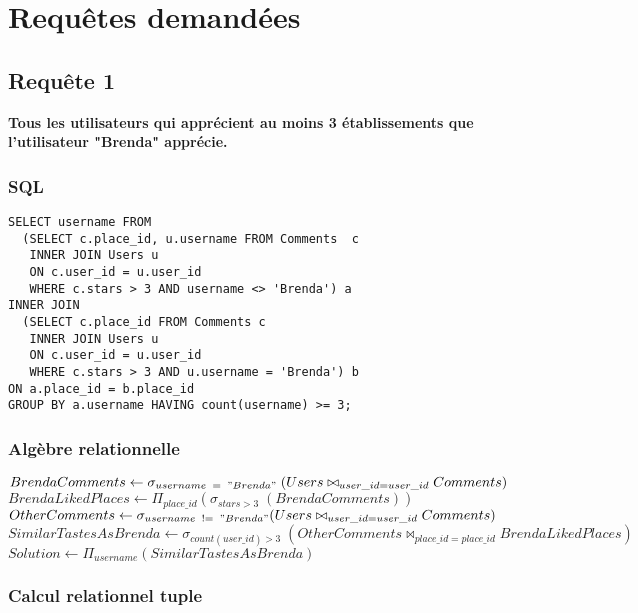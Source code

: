 \documentclass[a4paper,10pt]{article}
\begin{document}
\section{Requêtes demandées}

\subsection{Requête 1}

\textbf{Tous les utilisateurs qui apprécient au moins 3 établissements que l’utilisateur "Brenda" apprécie.}

\subsubsection{SQL}

\begin{verbatim}
SELECT username FROM 
  (SELECT c.place_id, u.username FROM Comments  c 
   INNER JOIN Users u 
   ON c.user_id = u.user_id 
   WHERE c.stars > 3 AND username <> 'Brenda') a
INNER JOIN
  (SELECT c.place_id FROM Comments c 
   INNER JOIN Users u 
   ON c.user_id = u.user_id 
   WHERE c.stars > 3 AND u.username = 'Brenda') b
ON a.place_id = b.place_id
GROUP BY a.username HAVING count(username) >= 3;
\end{verbatim}

\subsubsection{Algèbre relationnelle}

$BrendaComments \leftarrow \sigma_{username\;\;=\;\;"Brenda"}\;(Users \bowtie_{user\_id=user\_id} Comments )$\\

$BrendaLikedPlaces \leftarrow \Pi_{place\_id} (\sigma_{stars>3}\;(BrendaComments))$ \\

$OtherComments \leftarrow \sigma_{username\;\; != \;\;"Brenda"} (Users \bowtie_{user\_id=user\_id} Comments )$\\

$SimilarTastesAsBrenda \leftarrow \sigma_{count(user\_id)>3}\; (OtherComments\bowtie_{place\_id=place\_id}BrendaLikedPlaces) $\\

$Solution \leftarrow \Pi_{username} (SimilarTastesAsBrenda) $

\subsubsection{Calcul relationnel tuple}
\end{document}
